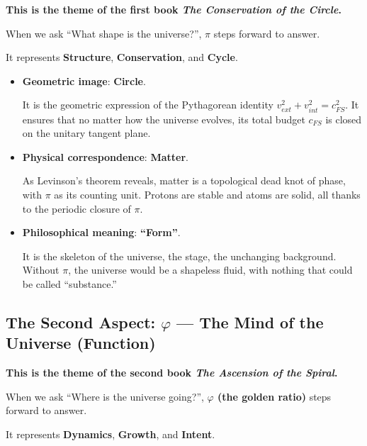 \documentclass[11pt,a4paper,twoside]{book}
\begin{document}
\textbf{This is the theme of the first book \textit{The Conservation of the Circle}.}

When we ask ``What shape is the universe?'', \textbf{$\pi$} steps forward to answer.

It represents \textbf{Structure}, \textbf{Conservation}, and \textbf{Cycle}.

\begin{itemize}
\item \textbf{Geometric image}: \textbf{Circle}.

    It is the geometric expression of the Pythagorean identity $v_{ext}^2 + v_{int}^2 = c_{FS}^2$. It ensures that no matter how the universe evolves, its total budget $c_{FS}$ is closed on the unitary tangent plane.

\item \textbf{Physical correspondence}: \textbf{Matter}.

    As Levinson's theorem reveals, matter is a topological dead knot of phase, with $\pi$ as its counting unit. Protons are stable and atoms are solid, all thanks to the periodic closure of $\pi$.

\item \textbf{Philosophical meaning}: \textbf{``Form''}.

    It is the skeleton of the universe, the stage, the unchanging background. Without $\pi$, the universe would be a shapeless fluid, with nothing that could be called ``substance.''
\end{itemize}

\subsection{The Second Aspect: $\varphi$ --- The Mind of the Universe (Function)}

\textbf{This is the theme of the second book \textit{The Ascension of the Spiral}.}

When we ask ``Where is the universe going?'', \textbf{$\varphi$ (the golden ratio)} steps forward to answer.

It represents \textbf{Dynamics}, \textbf{Growth}, and \textbf{Intent}.
\end{document}
